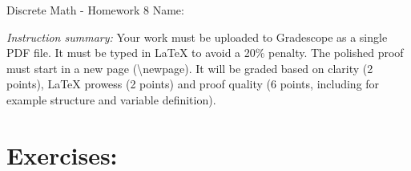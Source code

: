 \documentclass[12pt]{article}
\begin{document}
\begin{center}
	{\LARGE Discrete Math - Homework 8} \Large \newline
    Name:
\end{center}

\emph{Instruction summary:} Your work must be uploaded to Gradescope as a single PDF file. It must be typed in LaTeX to avoid a 20\% penalty. The polished proof must start in a new page (\textbackslash{newpage}). It will be graded based on clarity (2 points), LaTeX prowess (2 points) and proof quality (6 points, including for example structure and variable definition).

\section*{Exercises:}
\end{document}
